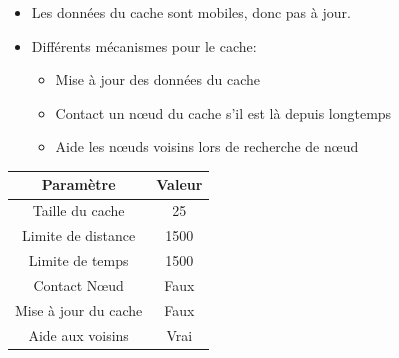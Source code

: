 \documentclass{beamer}
\begin{document}
  \begin{frame}
	\begin{itemize}
	\item Les données du cache sont mobiles, donc pas à jour.
	\item Différents mécanismes pour le cache:
		\begin{itemize}
		\item Mise à jour des données du cache
		\item Contact un nœud du cache s'il est là depuis longtemps
		\item Aide les nœuds voisins lors de recherche de nœud	
		\end{itemize}
	\end{itemize}
	\footnotesize{
	\begin{table}[!h]
  	\begin{center}
    	\begin{tabular}{|c|c|}
        \hline
      	 Paramètre & Valeur\\
      	\hline
     	 Taille du cache & 25\\
     	 Limite de distance &  1500\\
     	 Limite de temps & 1500\\
     	 Contact Nœud & Faux\\
     	 Mise à jour du cache & Faux\\
     	 Aide aux voisins & Vrai\\
      	\hline
    	\end{tabular}
  	\end{center}
	\end{table}
	}
  \end{frame}

 
\end{document}
